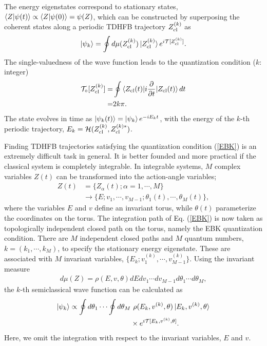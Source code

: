 \documentclass[11pt]{book} %
\begin{document}
The energy eigenstates correspond to stationary states,
$\braket{Z|\psi(t)} \propto \braket{Z|\psi(0)}=\psi(Z)$,
which can be constructed by superposing the coherent states along
a periodic TDHFB trajectory $Z_{\rm cl}^{(k)}$ as \cite{KS80,K81,SM88}
\begin{equation}
	\ket{\psi_k} = \oint d\mu(Z_{\rm cl}^{(k)}) \ket{Z_{\rm cl}^{(k)}}
	e^{i\mathcal{T}[Z_{\rm cl}^{(k)}]} .
\end{equation}
The single-valuedness of the wave function leads to
the quantization condition ($k$: integer)
\begin{align}
	\mathcal{T}_\circ[Z_{\rm cl}^{(k)}]=&
	\oint \braket{Z_{\rm cl}(t)| i\frac{\partial}{\partial t}
	|Z_{\rm cl}(t)} dt  \nonumber \\
	=& 2k\pi .
	\label{EBK}
\end{align}
The state evolves in time as $\ket{\psi_k(t)}=\ket{\psi_k}e^{-iE_k t}$,
with the energy of the $k$-th periodic trajectory,
$E_k=\mathcal{H}(Z_{\rm cl}^{(k)},Z_{\rm cl}^{(k)*})$.

Finding TDHFB trajectories satisfying the quantization condition
(\ref{EBK}) is an extremely difficult task in general.
It is better founded and more practical
if the classical system is completely integrable.
In integrable systems, $M$ complex variables $Z(t)$ can be transformed into
the action-angle variables;
\begin{align}
	Z(t) &= \{Z_{\alpha}(t);\alpha=1,\cdots,M \} \nonumber \\
	&\rightarrow
	\{E; v_1,\cdots,v_{M-1}; \theta_1(t),\cdots,\theta_M(t)\} ,
\end{align}
where the variables $E$ and $v$ define an invariant torus,
while $\theta(t)$ parameterize the coordinates on the torus.
The integration path of Eq. (\ref{EBK}) is now taken as topologically
independent closed path on the torus,
namely the EBK quantization condition.
There are $M$ independent closed paths and $M$ quantum numbers,
$k=(k_1,\cdots,k_M)$, to specify the stationary energy eigenstate.
These are associated with $M$ invariant variables,
$\{E_k;v_1^{(k)},\cdots,v_{M-1}^{(k)}\}$.
Using the invariant measure
\begin{align}
  d\mu(Z) = \rho(E,v,\theta) dEdv_1\cdots dv_{M-1}d\theta_1\cdots d\theta_M,
\end{align}
the $k$-th semiclassical wave function can be calculated as
\begin{align}
  \ket{\psi_k} \propto \oint d\theta_1\cdots \oint d\theta_M &\ 
	\rho(E_k,v^{(k)},\theta)
	\ket{E_k,v^{(k)},\theta} \nonumber \\
	&\times e^{i\mathcal{T}[E_k,v^{(k)},\theta]} .
  \label{semi_wave_func}
\end{align}
Here, we omit the integration with respect to the invariant variables,
$E$ and $v$.
\end{document}

